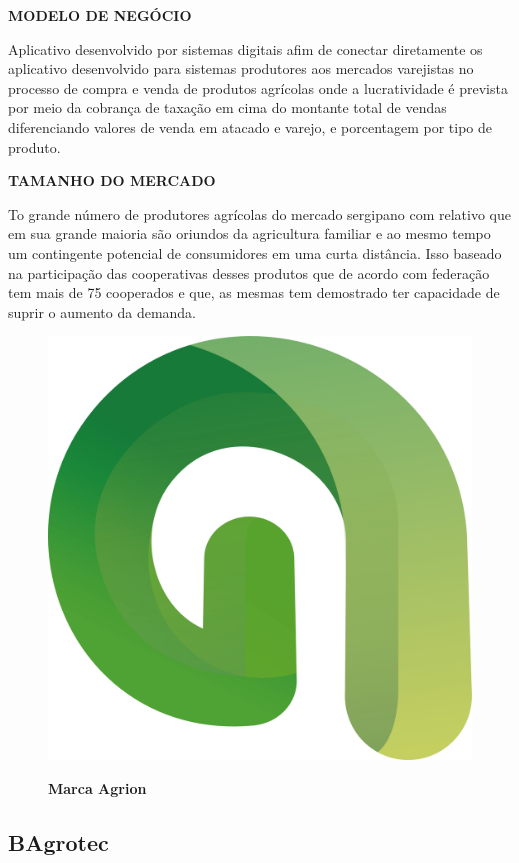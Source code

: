 \textbf{MODELO DE NEGÓCIO}

Aplicativo desenvolvido por sistemas digitais afim de conectar diretamente os  aplicativo desenvolvido para sistemas produtores aos mercados varejistas no processo de compra e venda de produtos agrícolas onde a lucratividade é prevista por meio da cobrança de taxação em cima do montante total de vendas diferenciando valores de venda em atacado e varejo, e porcentagem por tipo de produto.

\textbf{TAMANHO DO MERCADO}

To grande número de produtores agrícolas  do mercado sergipano com relativo que  em sua grande maioria são oriundos da agricultura familiar e ao mesmo tempo um contingente potencial de consumidores em uma curta distância. Isso baseado na  participação das cooperativas desses produtos que de acordo 
com federação tem mais de 75 cooperados e que, as mesmas tem demostrado ter capacidade de suprir o aumento da demanda.


\begin{figure}[!htb]
\centering
\caption{\textbf{Marca Agrion}}
\includegraphics[scale=0.2]{Imagens/agrion.png}
\label{figura_14}
\end{figure}
\newpage

\subsection{BAgrotec}

